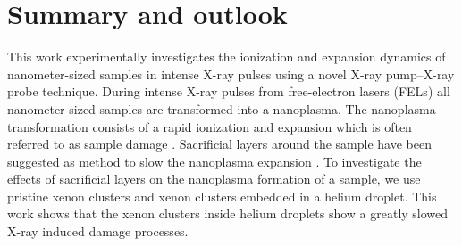 \chapter{Summary and outlook}\label{ch:summary_outlook}
%
This work experimentally investigates the ionization and expansion dynamics of nanometer-sized samples in intense X-ray pulses using a novel X-ray pump--X-ray probe technique. During intense X-ray pulses from free-electron lasers (FELs) all nanometer-sized samples are transformed into a nanoplasma. The nanoplasma transformation consists of a rapid ionization and expansion which is often referred to as sample damage \cite{Neutze-2000-Nature,Arbeiter-2011-NJP}. Sacrificial layers around the sample have been suggested as method to slow the nanoplasma expansion \cite{Hau-Riege-2007-PRL,Hau-Riege-2010-PRL}. To investigate the effects of sacrificial layers on the nanoplasma formation of a sample, we use pristine xenon clusters and xenon clusters embedded in a helium droplet. This work shows that the xenon clusters inside helium droplets show a greatly slowed X-ray induced damage processes.\\[1\baselineskip]
